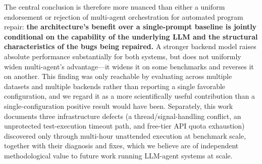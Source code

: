 \documentclass[conference]{IEEEtran}
\begin{document}
The central conclusion is therefore more nuanced than either a uniform endorsement or rejection of multi-agent orchestration for automated program repair: \textbf{the architecture's benefit over a single-prompt baseline is jointly conditional on the capability of the underlying LLM and the structural characteristics of the bugs being repaired.} A stronger backend model raises absolute performance substantially for both systems, but does not uniformly widen multi-agent's advantage---it widens it on some benchmarks and reverses it on another. This finding was only reachable by evaluating across multiple datasets and multiple backends rather than reporting a single favorable configuration, and we regard it as a more scientifically useful contribution than a single-configuration positive result would have been. Separately, this work documents three infrastructure defects (a thread/signal-handling conflict, an unprotected test-execution timeout path, and free-tier API quota exhaustion) discovered only through multi-hour unattended execution at benchmark scale, together with their diagnosis and fixes, which we believe are of independent methodological value to future work running LLM-agent systems at scale.
\end{document}
